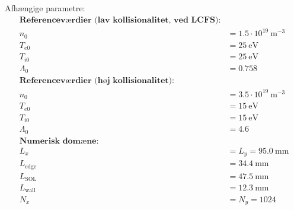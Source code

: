 \documentclass{article}
\begin{document}
Afhængige parametre:
\begin{align*}
\textbf{Referenceværdier (lav kollisionalitet, ved LCFS):} \\
n_0 &= 1.5 \cdot 10^{19}~\mathrm{m}^{-3} \\
T_{e0} &= 25~\mathrm{eV} \\
T_{i0} &= 25~\mathrm{eV} \\
\Lambda_0 &= 0.758 \\
\textbf{Referenceværdier (høj kollisionalitet):} \\
n_0 &= 3.5 \cdot 10^{19}~\mathrm{m}^{-3} \\
T_{e0} &= 15~\mathrm{eV} \\
T_{i0} &= 15~\mathrm{eV} \\
\Lambda_0 &= 4.6 \\
\textbf{Numerisk domæne:} \\
L_x &= L_y = 95.0~\mathrm{mm} \\
L_{\text{edge}} &= 34.4~\mathrm{mm} \\
L_{\text{SOL}} &= 47.5~\mathrm{mm} \\
L_{\text{wall}} &= 12.3~\mathrm{mm} \\
N_x &= N_y = 1024
\end{align*}
\end{document}
